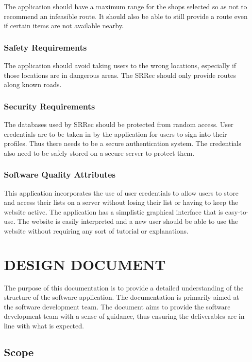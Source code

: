 \documentclass[10pt,twocolumn]{witseiepaper}
\begin{document}
		The application should have a maximum range for the shops selected so as not to recommend an infeasible route. It should also be able to still provide a route even if certain items are not available nearby.
		
		\subsubsection{Safety Requirements}
		
		The application should avoid taking users to the wrong locations, especially if those locations are in dangerous areas. The SRRec should only provide routes along known roads.
		
		\subsubsection{Security Requirements}
		
		The databases used by SRRec should be protected from random access. User credentials are to be taken in by the application for users to sign into their profiles. Thus there needs to be a secure authentication system. The credentials also need to be safely stored on a secure server to protect them.
		
		\subsubsection{Software Quality Attributes}
		
		This application incorporates the use of user credentials to allow users to store and access their lists on a 	server without losing their list or having to keep the website active. The application has a simplistic graphical interface that is easy-to-use. The website is easily interpreted and a new user should be able to use the website without requiring any sort of tutorial or explanations.

\section{DESIGN DOCUMENT}

	The purpose of this documentation is to provide a detailed understanding of the structure of the software application. The documentation is primarily aimed at the software development team. The document aims to provide the software development team with a sense of guidance, thus ensuring the deliverables are in line with what is expected.
	
	\subsection{Scope}
	
\end{document}
